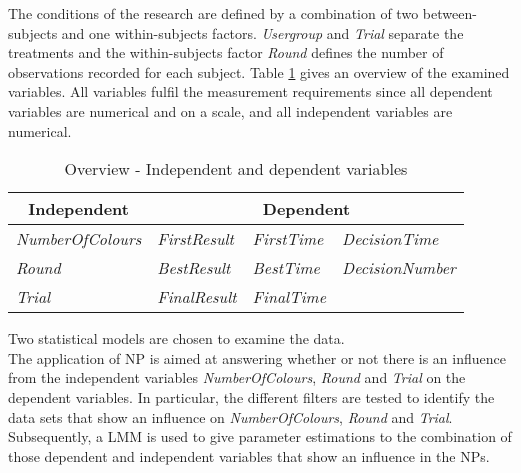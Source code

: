 The conditions of the research are defined by a combination of two between-subjects and one within-subjects factors. \textit{Usergroup} and \textit{Trial} separate the treatments and the within-subjects factor \textit{Round} defines the number of observations recorded for each subject.
Table \ref{tab:OverviewVariables} gives an overview of the examined variables. All variables fulfil the measurement requirements since all dependent variables are numerical and on a scale, and all independent variables are numerical. \\
\begin{table}
  \centering
    \begin{tabular}{l|lll}
    \toprule
    \multicolumn{1}{c|}{Independent}  & \multicolumn{3}{c}{Dependent} \\
    \midrule
    \textit{NumberOfColours} & \textit{FirstResult} & \textit{FirstTime} & \textit{DecisionTime}\\
    \textit{Round} & \textit{BestResult} & \textit{BestTime} & \textit{DecisionNumber}\\
    \textit{Trial} & \textit{FinalResult} & \textit{FinalTime}\\
    \bottomrule
    \end{tabular}%
      \caption{Overview - Independent and dependent variables}
    \label{tab:OverviewVariables}%
\end{table}%

Two statistical models are chosen to examine the data.\\
The application of \acf{NP} is aimed at answering whether or not there is an influence from the independent variables \textit{NumberOfColours}, \textit{Round} and \textit{Trial} on the dependent variables. In particular, the different filters are tested to identify the data sets that show an influence on \textit{NumberOfColours}, \textit{Round} and \textit{Trial}.\\
Subsequently, a \acf{LMM} is used to give parameter estimations to the combination of those dependent and independent variables that show an influence in the \ac{NP}s.



